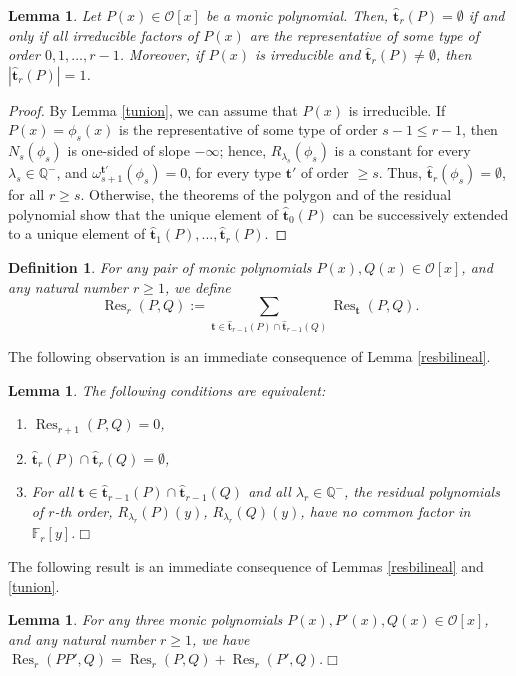 \documentclass{amsart}
\newtheorem{lemma}[theorem]{Lemma}
\newtheorem{definition}[theorem]{Definition}
\newcommand{\Q}{\mathbb Q}
\def\op{\operatorname}
\def\ff#1{\mathbb{F}_{#1}}
\def\la{\lambda}
\def\om{\omega}
\def\oo{{\mathcal O}}
\def\res{\op{Res}}
\def\tt{\hat{\mathbf{t}}}
\def\ty{\mathbf{t}}
\def\zpx{\oo[x]}
\begin{document}
\begin{lemma}\label{empty}
Let $P(x)\in\zpx$ be a monic polynomial. Then,
$\tt_r(P)=\emptyset$ if and only if all irreducible factors of $P(x)$ are the representative of some type of order $0,1,\dots,r-1$.
Moreover, if $P(x)$ is irreducible and $\tt_r(P)\ne\emptyset$, then $|\tt_r(P)|=1$.  
\end{lemma}

\begin{proof}
By Lemma \ref{tunion}, we can assume that $P(x)$ is irreducible.
If $P(x)=\phi_s(x)$ is the representative of some type of order $s-1\le r-1$, then
$N_s(\phi_s)$ is one-sided of slope $-\infty$; hence, $R_{\la_s}(\phi_s)$ is a constant for every $\la_s\in\Q^-$, and $\om^{\ty'}_{s+1}(\phi_s)=0$, for every type $\ty'$ of order $\ge s$. Thus, $\tt_r(\phi_s)=\emptyset$, for all $r\ge s$. Otherwise, the theorems of the polygon and of the residual polynomial show that the unique element of  $\tt_0(P)$ can be successively extended to a unique element of $\tt_1(P),\dots,\tt_r(P)$. 
\end{proof}
 
\begin{definition}
For any pair of monic polynomials $P(x),Q(x)\in\zpx$, and any natural number $r\ge 1$, we define $$\res_r(P,Q):=\sum_{\ty\in\tt_{r-1}(P)\cap\tt_{r-1}(Q)}\res_\ty(P,Q).$$
\end{definition}

The following observation is an immediate consequence of Lemma \ref{resbilineal}.
\begin{lemma}\label{resr+1}The following conditions are equivalent:
 \begin{enumerate}
 \item $\res_{r+1}(P,Q)=0$,
\item $\tt_r(P)\cap\tt_r(Q)=\emptyset$,
\item For all $\ty\in \tt_{r-1}(P)\cap\tt_{r-1}(Q)$ and all $\la_r\in\Q^-$, the residual polynomials of $r$-th order, $R_{\la_r}(P)(y)$, $R_{\la_r}(Q)(y)$, have no common factor in
$\ff{r}[y]$.\hfill{$\Box$}
\end{enumerate}
\end{lemma}

The following result is an immediate consequence of Lemmas \ref{resbilineal} and \ref{tunion}.
\begin{lemma}\label{resbilineal2}
For any three monic polynomials $P(x),P'(x),Q(x)\in\zpx$, and any natural number $r\ge 1$, we have $\res_r(PP',Q)=\res_r(P,Q)+\res_r(P',Q)$.\hfill{$\Box$}
\end{lemma}
\end{document}

